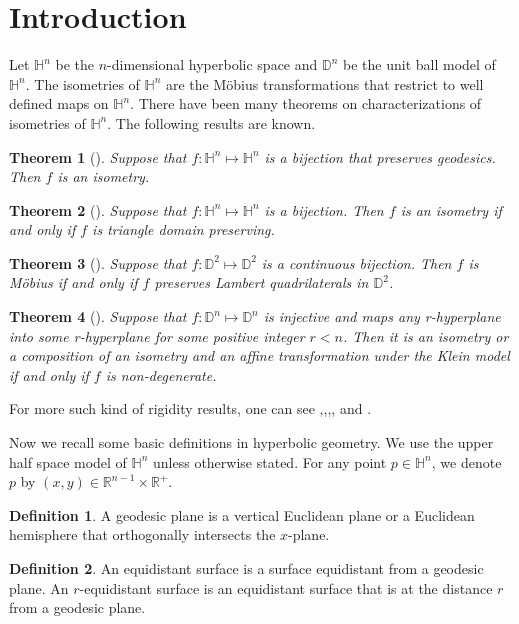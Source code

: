 \documentclass[12pt,reqno,oneside]{amsart}
\theoremstyle{plain}
\newtheorem{Theorem}{Theorem}[section]
\theoremstyle{definition}
\newtheorem{Definition}{Definition}[section]
\theoremstyle{remark}
\numberwithin{equation}{section}
\renewcommand{\H}{{\mathbb{H}^n}}
\begin{document}
\section{Introduction}
Let $\H$ be the $n$-dimensional hyperbolic space and $\mathbb{D}^n$ be the unit
ball model of $\H$.  The isometries of $\H$ are the
M\"{o}bius transformations that restrict to well defined maps on $\H$.  There
have been many theorems on characterizations of isometries of $\H$.  The
following results are known.
\begin{Theorem}[\cite{Jeffers2000Lost}] \label{geodesic_preserving}
	Suppose that $f:\H \mapsto \H$ is a bijection that preserves
	geodesics. Then $f$ is an isometry.
\end{Theorem}
\begin{Theorem}[\cite{Li09}]
	Suppose that $f: \H\mapsto\H$ is a bijection.  Then $f$ is an isometry if and
	only if $f$ is triangle domain preserving.
\end{Theorem}
\begin{Theorem}[\cite{Shi06}]
	Suppose that $f:\mathbb{D}^2\mapsto \mathbb{D}^2$ is a continuous bijection.
	Then $f$ is M\"{o}bius if and only if $f$ preserves Lambert quadrilaterals
	in $\mathbb{D}^2$.
\end{Theorem}
\begin{Theorem}[\cite{LiWangFundamental2016}]
	Suppose that $f : \mathbb{D}^n \mapsto \mathbb{D}^n $ is injective and maps
	any r-hyperplane into some r-hyperplane for some positive integer $r<n$.
	Then it is an isometry or a composition of an isometry and an affine
	transformation under the Klein model if and only if $f$ is non-degenerate.  
\end{Theorem}
For more such kind of rigidity results, one can see \cite{BeardonMinda2002sphere},\cite{chupin99},\cite{Gibbons1979Circle},\cite{Li09},\cite{huangwangwang2010isometries} and \cite{Shi08}.\par
Now we recall some basic definitions in hyperbolic geometry.  We use the upper
half space model of $\H$ unless otherwise stated.  For any point $p \in \H$, we
denote $p$ by $(x,y) \in \mathbb{R}^{n-1}\times \mathbb{R}^+$.
\begin{Definition}
	A geodesic plane is a vertical Euclidean plane or a Euclidean hemisphere
	that orthogonally intersects the $x$-plane.
\end{Definition}
\begin{Definition}
	An equidistant surface is a surface equidistant from a geodesic plane. An
	$r$-equidistant surface is an equidistant surface that is at the distance $r$
	from a geodesic plane.
\end{Definition}	
\end{document}
